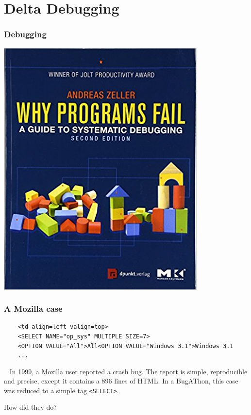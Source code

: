 \documentclass[lualatex]{beamer}
\begin{document}
\section{Delta Debugging}

\begin{frame}
  \frametitle{Debugging}

  \begin{center}
    \includegraphics[height=0.8\textheight]{why_program_fails.jpg}
  \end{center}
\end{frame}

\begin{frame}[fragile]
  \frametitle{A Mozilla case}

  \begin{verbatim}
    <td align=left valign=top>
    <SELECT NAME="op_sys" MULTIPLE SIZE=7>
    <OPTION VALUE="All">All<OPTION VALUE="Windows 3.1">Windows 3.1
    ...
  \end{verbatim}
  \begin{block}{~}
    In 1999, a Mozilla user reported a crash bug.
    The report is simple, reproducible and precise,
    except it contains a 896 lines of HTML.
    In a BugAThon, this case was reduced to a simple tag \texttt{<SELECT>}.
    \pause
    \begin{center}
      How did they do?
    \end{center}
  \end{block}
\end{frame}
\end{document}
